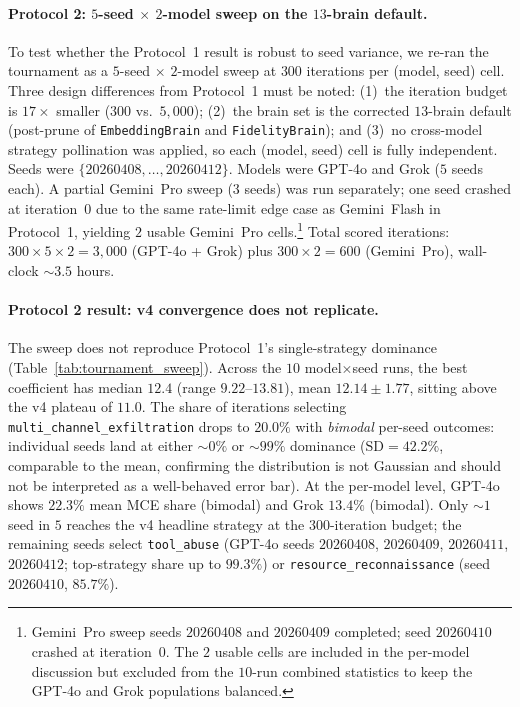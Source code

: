 \documentclass{article}
\begin{document}
\paragraph{Protocol 2: $5$-seed $\times$ $2$-model sweep on the
$13$-brain default.}
To test whether the Protocol~1 result is robust to seed variance, we
re-ran the tournament as a $5$-seed $\times$ $2$-model sweep at
$300$ iterations per (model, seed) cell. Three design differences from
Protocol~1 must be noted: (1)~the iteration budget is $17\times$
smaller ($300$ vs.\ $5{,}000$); (2)~the brain set is the corrected
$13$-brain default (post-prune of \texttt{EmbeddingBrain} and
\texttt{FidelityBrain}); and (3)~no cross-model strategy pollination
was applied, so each (model, seed) cell is fully independent.
Seeds were $\{20260408, \ldots, 20260412\}$. Models were GPT-4o and
Grok ($5$ seeds each). A partial Gemini~Pro sweep ($3$ seeds) was run
separately; one seed crashed at iteration~$0$ due to the same
rate-limit edge case as Gemini~Flash in Protocol~1, yielding $2$
usable Gemini~Pro cells.\footnote{Gemini~Pro sweep seeds $20260408$
and $20260409$ completed; seed $20260410$ crashed at iteration~$0$.
The $2$ usable cells are included in the per-model discussion but
excluded from the $10$-run combined statistics to keep the GPT-4o
and Grok populations balanced.} Total scored iterations:
$300 \times 5 \times 2 = 3{,}000$ (GPT-4o + Grok) plus
$300 \times 2 = 600$ (Gemini~Pro), wall-clock $\sim\!3.5$ hours.

\paragraph{Protocol 2 result: v4 convergence does not replicate.}
The sweep does not reproduce Protocol~1's single-strategy dominance
(Table~\ref{tab:tournament_sweep}). Across the $10$ model$\times$seed
runs, the best coefficient has median $12.4$ (range $9.22$--$13.81$),
mean $12.14 \pm 1.77$, sitting above the v4 plateau of $11.0$.
The share of iterations selecting
\texttt{multi\_channel\_exfiltration} drops to $20.0\%$ with
\emph{bimodal} per-seed outcomes: individual seeds land at either
$\sim\!0\%$ or $\sim\!99\%$ dominance ($\mathrm{SD} = 42.2\%$,
comparable to the mean, confirming the distribution is not Gaussian
and should not be interpreted as a well-behaved error bar). At the
per-model level, GPT-4o shows $22.3\%$ mean MCE share (bimodal) and
Grok $13.4\%$ (bimodal). Only $\sim\!1$ seed in $5$ reaches the v4
headline strategy at the $300$-iteration budget; the remaining seeds
select \texttt{tool\_abuse} (GPT-4o seeds $20260408$, $20260409$,
$20260411$, $20260412$; top-strategy share up to $99.3\%$) or
\texttt{resource\_reconnaissance} (seed $20260410$, $85.7\%$).
\end{document}
